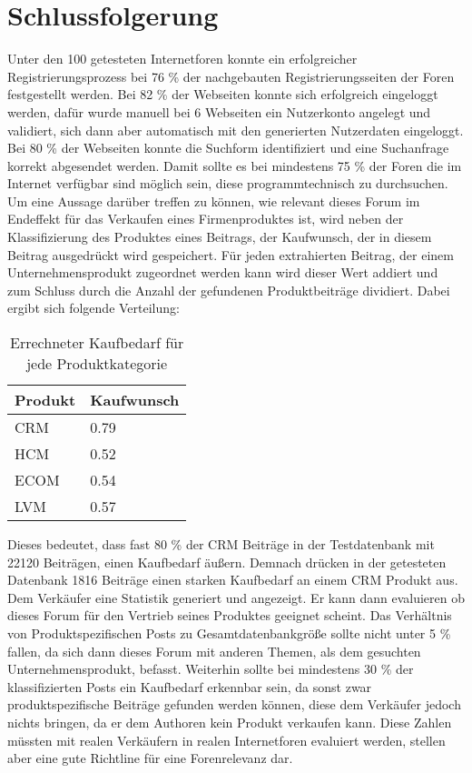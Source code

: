 \section{Schlussfolgerung}
Unter den 100 getesteten Internetforen konnte ein erfolgreicher Registrierungsprozess bei 76 \% der nachgebauten Registrierungsseiten der Foren festgestellt werden. Bei 82 \% der Webseiten konnte sich erfolgreich eingeloggt werden, dafür wurde manuell bei 6 Webseiten ein Nutzerkonto angelegt und validiert, sich dann aber automatisch mit den generierten Nutzerdaten eingeloggt. Bei 80 \% der Webseiten konnte die Suchform identifiziert und eine Suchanfrage korrekt abgesendet werden. Damit sollte es bei mindestens 75 \% der Foren die im Internet verfügbar sind möglich sein, diese programmtechnisch zu durchsuchen.
Um eine Aussage darüber treffen zu können, wie relevant dieses Forum im Endeffekt für das Verkaufen eines Firmenproduktes ist, wird neben der Klassifizierung des Produktes eines Beitrags, der Kaufwunsch, der in diesem Beitrag ausgedrückt wird gespeichert. Für jeden extrahierten Beitrag, der einem Unternehmensprodukt zugeordnet werden kann wird dieser Wert addiert und zum Schluss durch die Anzahl der gefundenen Produktbeiträge dividiert. Dabei ergibt sich folgende Verteilung: 

\begin{table}[h!]
\centering
\begin{tabular}{ | p{3cm} | l |}
\hline
Produkt & Kaufwunsch\\ \hline
CRM & 0.79\\ \hline
HCM & 0.52 \\ \hline
ECOM & 0.54 \\ \hline
LVM & 0.57 \\ \hline
\end{tabular}
\caption{Errechneter Kaufbedarf für jede Produktkategorie}
\end{table}

Dieses bedeutet, dass fast 80 \% der CRM Beiträge in der Testdatenbank mit 22120 Beiträgen, einen Kaufbedarf äußern. Demnach drücken in der getesteten Datenbank 1816 Beiträge einen starken Kaufbedarf an einem CRM Produkt aus. Dem Verkäufer eine Statistik generiert und angezeigt. Er kann dann evaluieren ob dieses Forum für den Vertrieb seines Produktes geeignet scheint. Das Verhältnis von Produktspezifischen Posts zu Gesamtdatenbankgröße sollte nicht unter 5 \% fallen, da sich dann dieses Forum mit anderen Themen, als dem gesuchten Unternehmensprodukt, befasst. Weiterhin sollte bei mindestens 30 \% der klassifizierten Posts ein Kaufbedarf erkennbar sein, da sonst zwar produktspezifische Beiträge gefunden werden können, diese dem Verkäufer jedoch nichts bringen, da er dem Authoren kein Produkt verkaufen kann. Diese Zahlen müssten mit realen Verkäufern in realen Internetforen evaluiert werden, stellen aber eine gute Richtline für eine Forenrelevanz dar.

